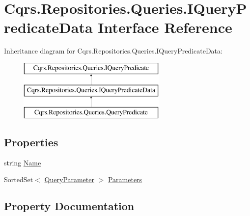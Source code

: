 \hypertarget{interfaceCqrs_1_1Repositories_1_1Queries_1_1IQueryPredicateData}{}\section{Cqrs.\+Repositories.\+Queries.\+I\+Query\+Predicate\+Data Interface Reference}
\label{interfaceCqrs_1_1Repositories_1_1Queries_1_1IQueryPredicateData}
Inheritance diagram for Cqrs.\+Repositories.\+Queries.\+I\+Query\+Predicate\+Data\+:\begin{figure}[H]
\begin{center}
\leavevmode
\includegraphics[height=3.000000cm]{interfaceCqrs_1_1Repositories_1_1Queries_1_1IQueryPredicateData}
\end{center}
\end{figure}
\subsection*{Properties}
\begin{DoxyCompactItemize}
\item 
string \hyperlink{interfaceCqrs_1_1Repositories_1_1Queries_1_1IQueryPredicateData_a88461542ea0befb00874ebbb086387aa_a88461542ea0befb00874ebbb086387aa}{Name}
\item 
Sorted\+Set$<$ \hyperlink{classCqrs_1_1Repositories_1_1Queries_1_1QueryParameter}{Query\+Parameter} $>$ \hyperlink{interfaceCqrs_1_1Repositories_1_1Queries_1_1IQueryPredicateData_a7a79d734568d6ef5f9b2446bd0e99894_a7a79d734568d6ef5f9b2446bd0e99894}{Parameters}
\end{DoxyCompactItemize}


\subsection{Property Documentation}
\mbox{\label{interfaceCqrs_1_1Repositories_1_1Queries_1_1IQueryPredicateData_a88461542ea0befb00874ebbb086387aa_a88461542ea0befb00874ebbb086387aa}} 
